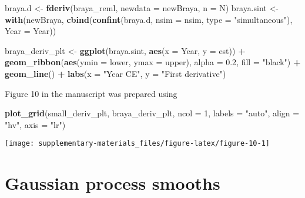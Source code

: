 \documentclass[12pt,]{article}
\newenvironment{Shaded}{\begin{snugshade}}{\end{snugshade}}
\newcommand{\DataTypeTok}[1]{\textcolor[rgb]{0.13,0.29,0.53}{#1}}
\newcommand{\DecValTok}[1]{\textcolor[rgb]{0.00,0.00,0.81}{#1}}
\newcommand{\FloatTok}[1]{\textcolor[rgb]{0.00,0.00,0.81}{#1}}
\newcommand{\KeywordTok}[1]{\textcolor[rgb]{0.13,0.29,0.53}{\textbf{#1}}}
\newcommand{\NormalTok}[1]{#1}
\newcommand{\OperatorTok}[1]{\textcolor[rgb]{0.81,0.36,0.00}{\textbf{#1}}}
\newcommand{\StringTok}[1]{\textcolor[rgb]{0.31,0.60,0.02}{#1}}
\begin{document}
\begin{Shaded}
\begin{Highlighting}[]
\NormalTok{braya.d <-}\StringTok{ }\KeywordTok{fderiv}\NormalTok{(braya_reml, }\DataTypeTok{newdata =}\NormalTok{ newBraya, }\DataTypeTok{n =}\NormalTok{ N)}
\NormalTok{braya.sint <-}\StringTok{ }\KeywordTok{with}\NormalTok{(newBraya,}
                   \KeywordTok{cbind}\NormalTok{(}\KeywordTok{confint}\NormalTok{(braya.d, }\DataTypeTok{nsim =}\NormalTok{ nsim,}
                                 \DataTypeTok{type =} \StringTok{"simultaneous"}\NormalTok{),}
                         \DataTypeTok{Year =}\NormalTok{ Year))}

\NormalTok{braya_deriv_plt <-}\StringTok{ }\KeywordTok{ggplot}\NormalTok{(braya.sint, }\KeywordTok{aes}\NormalTok{(}\DataTypeTok{x =}\NormalTok{ Year, }\DataTypeTok{y =}\NormalTok{ est)) }\OperatorTok{+}
\StringTok{    }\KeywordTok{geom_ribbon}\NormalTok{(}\KeywordTok{aes}\NormalTok{(}\DataTypeTok{ymin =}\NormalTok{ lower, }\DataTypeTok{ymax =}\NormalTok{ upper),}
                \DataTypeTok{alpha =} \FloatTok{0.2}\NormalTok{, }\DataTypeTok{fill =} \StringTok{"black"}\NormalTok{) }\OperatorTok{+}
\StringTok{    }\KeywordTok{geom_line}\NormalTok{() }\OperatorTok{+}
\StringTok{    }\KeywordTok{labs}\NormalTok{(}\DataTypeTok{x =} \StringTok{"Year CE"}\NormalTok{, }\DataTypeTok{y =} \StringTok{"First derivative"}\NormalTok{)}
\end{Highlighting}
\end{Shaded}

Figure 10 in the manuscript was prepared using

\begin{Shaded}
\begin{Highlighting}[]
\KeywordTok{plot_grid}\NormalTok{(small_deriv_plt, braya_deriv_plt, }\DataTypeTok{ncol =} \DecValTok{1}\NormalTok{, }\DataTypeTok{labels =} \StringTok{"auto"}\NormalTok{,}
          \DataTypeTok{align =} \StringTok{"hv"}\NormalTok{, }\DataTypeTok{axis =} \StringTok{"lr"}\NormalTok{)}
\end{Highlighting}
\end{Shaded}

\begin{center}\texttt{[image: supplementary-materials\_files/figure-latex/figure-10-1]} \end{center}

\hypertarget{gaussian-process-smooths}{%
\section{Gaussian process smooths}\label{gaussian-process-smooths}}
\end{document}
